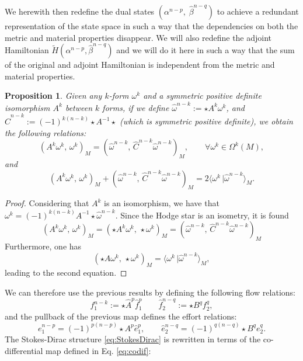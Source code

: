 \documentclass{elsarticle}
\newtheorem{proposition}{Proposition}
\newcommand*{\dual}[1]{\ensuremath{\widehat{#1}}}
\newcommand{\inpr}[3][]{\ensuremath{( #2, \, #3 )_{#1}}}
\newcommand{\dualpr}[3][]{\ensuremath{\langle #2 \, \vert #3 \rangle_{#1}}}
\begin{document}
We herewith then redefine the dual states $(\alpha^{n-p},\; \dual{\beta}^{n-q})$ to achieve a redundant representation of the state space in such a way that the dependencies on both the metric and material properties disappear. We will also redefine the adjoint Hamiltonian $\widetilde{H}(\alpha^{n-p},\dual{\beta}^{n-q})$ and we will do it here in such a way that the sum of the original and adjoint Hamiltonian is independent from the metric and material properties.
\begin{proposition}
Given any $k$-form $\omega^k$ and a symmetric positive definite isomorphism $A^k$ between $k$ forms, if we define  $\dual{\omega}^{n-k}:= \star A^k \omega^k$, and
$\dual{C}^{n-k}:=(-1)^{k(n-k)}\star A^{-1} \star$ (which is symmetric positive definite), we obtain the following relations:
\begin{equation}\label{eq:EcoE}
    \inpr[M]{A^k\omega^k}{\omega^k}=\inpr[M]{\dual{\omega}^{n-k}}{\dual{C}^{n-k}\dual{\omega}^{n-k}}, \qquad \forall \omega^k \in \Omega^k(M),
\end{equation}
and
\begin{equation}\label{eq:noMetric}
    \inpr[M]{A^k \omega^k}{\omega^k}+\inpr[M]{\dual{\omega}^{n-k}}{\dual{C}^{n-k} \dual{\omega}^{n-k}}
    =2\dualpr[M]{\omega^k}{\dual{\omega}^{n-k}}.
\end{equation}
\end{proposition}
\begin{proof}
Considering that $A^k$ is an isomorphism, we have that $\omega^k=(-1)^{k(n-k)}A^{-1} \star \dual{\omega}^{n-k}$. Since the Hodge star is an isometry, it is found
\begin{equation}
\inpr[M]{A^k \omega^k}{\omega^k} = \inpr[M]{\star A^k \omega^k}{\star \omega^k} = \inpr[M]{\dual{\omega}^{n-k}}{\dual{C}^{n-k} \dual{\omega}^{n-k}}
\end{equation}
Furthermore, one has
\begin{equation}
    \inpr[M]{\star A \omega^k}{\star \omega^k} = \dualpr[M]{\omega^k}{\dual{\omega}^{n-k}},
\end{equation}
leading to the second equation.
\end{proof}
We can therefore use the previous results by defining the following flow relations:
\[
{f}^{n-k}_1:=\star \dual{A}^p \dual{f}^p_1
\qquad 
\dual{f}^{n-q}_2:=\star B^q f^q_2, 
\]
\noindent and the pullback of the previous map defines the effort relations:
\[
{e}^{n-p}_1=(-1)^{p(n-p)}\star A^p \dual{e}^p_1,
\qquad
\dual{e}^{n-q}_2=(-1)^{q(n-q)}\star B^q {e}^q_2.
\]
The Stokes-Dirac structure \eqref{eq:StokesDirac} is rewritten in terms of the co-differential map defined in Eq. \eqref{eq:codif}:
\end{document}
